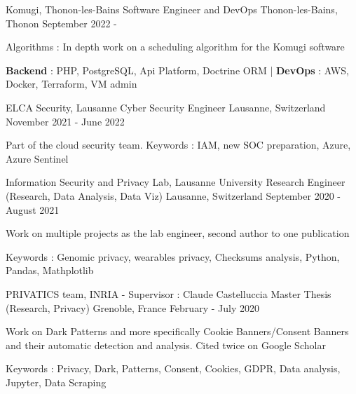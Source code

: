 


\begin{cventries}
	
	\cventry
	{Komugi, Thonon-les-Bains} %
	{Software Engineer and DevOps} %
	{Thonon-les-Bains, Thonon} %
	{September 2022 - } %
	{ %
		\begin{cvitems}
			\item {Algorithms : In depth work on a scheduling algorithm for the Komugi software}
			\item {\textbf{Backend} : PHP, PostgreSQL, Api Platform, Doctrine ORM | \textbf{DevOps} : AWS, Docker, Terraform, VM admin}
		\end{cvitems}
	}
	
	\cventry
	{ELCA Security, Lausanne} %
	{Cyber Security Engineer} %
	{Lausanne, Switzerland} %
	{November 2021 - June 2022} %
	{ %
		\begin{cvitems}
			\item {Part of the cloud security team. Keywords : IAM, new SOC preparation, Azure, Azure Sentinel}
		\end{cvitems}
	}
	
	\cventry
	{Information Security and Privacy Lab, Lausanne University} %
	{Research Engineer (Research, Data Analysis, Data Viz)} %
	{Lausanne, Switzerland} %
	{September 2020 - August 2021} %
	{ %
		\begin{cvitems}
			\item {Work on multiple projects as the lab engineer, second author to one publication}
			\item {Keywords : Genomic privacy, wearables privacy, Checksums analysis, Python, Pandas, Mathplotlib}
		\end{cvitems}
	}
	
	\cventry
	{PRIVATICS team, INRIA - Supervisor : Claude Castelluccia} %
	{Master Thesis (Research, Privacy)} %
	{Grenoble, France} %
	{February - July 2020} %
	{ %
		\begin{cvitems}
			\item {Work on Dark Patterns and more specifically Cookie Banners/Consent Banners and their automatic detection and analysis. Cited twice on Google Scholar}
			\item {Keywords : Privacy, Dark, Patterns, Consent, Cookies, GDPR, Data analysis, Jupyter, Data Scraping}
		\end{cvitems}
	}
	

\end{cventries}
